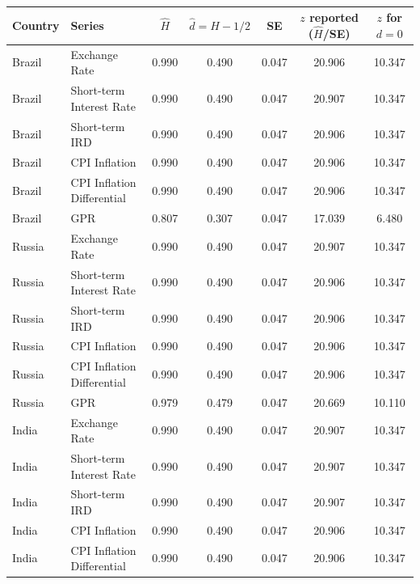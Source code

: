 \begin{table}[!htbp]
\fontsize{6}{7}\selectfont
\caption{}
\centering
\begin{tabular}{llccccc}
\hline
Country & Series & $\hat{H}$ & $\hat{d} = \hat{H} - 1/2$ & SE & $z$ reported ($\hat{H}$/SE) & $z$ for $d=0$ \\ \hline
Brazil & Exchange Rate & 0.990 & 0.490 & 0.047 & 20.906 & 10.347 \\
Brazil & Short-term Interest Rate & 0.990 & 0.490 & 0.047 & 20.907 & 10.347 \\
Brazil & Short-term IRD & 0.990 & 0.490 & 0.047 & 20.906 & 10.347 \\
Brazil & CPI Inflation & 0.990 & 0.490 & 0.047 & 20.906 & 10.347 \\
Brazil & CPI Inflation Differential & 0.990 & 0.490 & 0.047 & 20.906 & 10.347 \\
Brazil & GPR & 0.807 & 0.307 & 0.047 & 17.039 & 6.480 \\
Russia & Exchange Rate & 0.990 & 0.490 & 0.047 & 20.907 & 10.347 \\
Russia & Short-term Interest Rate & 0.990 & 0.490 & 0.047 & 20.906 & 10.347 \\
Russia & Short-term IRD & 0.990 & 0.490 & 0.047 & 20.906 & 10.347 \\
Russia & CPI Inflation & 0.990 & 0.490 & 0.047 & 20.906 & 10.347 \\
Russia & CPI Inflation Differential & 0.990 & 0.490 & 0.047 & 20.906 & 10.347 \\
Russia & GPR & 0.979 & 0.479 & 0.047 & 20.669 & 10.110 \\
India & Exchange Rate & 0.990 & 0.490 & 0.047 & 20.907 & 10.347 \\
India & Short-term Interest Rate & 0.990 & 0.490 & 0.047 & 20.907 & 10.347 \\
India & Short-term IRD & 0.990 & 0.490 & 0.047 & 20.907 & 10.347 \\
India & CPI Inflation & 0.990 & 0.490 & 0.047 & 20.906 & 10.347 \\
India & CPI Inflation Differential & 0.990 & 0.490 & 0.047 & 20.906 & 10.347 \\

\end{tabular}
\end{table}

